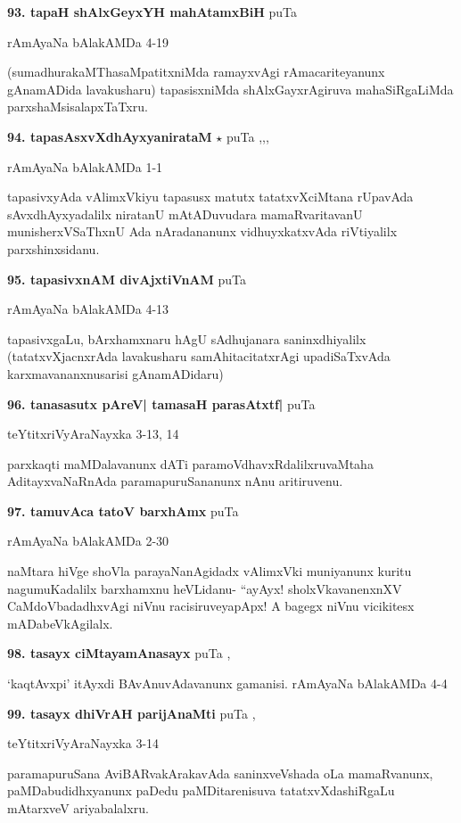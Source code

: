 \medskip
\noindent\textbf{93. tapaH shAlxGeyxYH mahAtamxBiH} \hfill puTa \pageref{211}

\hfill rAmAyaNa bAlakAMDa 4-19

(sumadhurakaMThasaMpatitxniMda ramayxvAgi rAmacariteyanunx gAnamADida lavakusharu) tapasisxniMda shAlxGayxrAgiruva mahaSiRgaLiMda parxshaMsisalapxTaTxru. 

\medskip
\noindent\textbf{94. tapasAsxvXdhAyxyanirataM} $\star$ \hfill puTa \pageref{153},\pageref{162},\pageref{194},\pageref{232e}

\hfill rAmAyaNa bAlakAMDa 1-1

tapasivxyAda vAlimxVkiyu tapasusx matutx tatatxvXciMtana rUpavAda sAvxdhAyxyadalilx niratanU mAtADuvudara mamaRvaritavanU munisherxVSaThxnU Ada nAradananunx vidhuyxkatxvAda riVtiyalilx parxshinxsidanu.

\medskip
\noindent\textbf{95. tapasivxnAM divAjxtiVnAM } \hfill puTa \pageref{211}

\hfill rAmAyaNa bAlakAMDa 4-13

tapasivxgaLu, bArxhamxnaru hAgU sAdhujanara saninxdhiyalilx (tatatxvXjacnxrAda lavakusharu samAhitacitatxrAgi upadiSaTxvAda karxmavananxnusarisi gAnamADidaru)

\medskip
\noindent\textbf{96. tanasasutx pAreV| tamasaH parasAtxtf|} \hfill puTa \pageref{251}

\hfill teYtitxriVyAraNayxka 3-13, 14

parxkaqti maMDalavanunx dATi paramoVdhavxRdalilxruvaMtaha AditayxvaNaRnAda paramapuruSananunx nAnu aritiruvenu.

\medskip
\noindent\textbf{97. tamuvAca tatoV barxhAmx} \hfill puTa \pageref{203d}

\hfill rAmAyaNa bAlakAMDa 2-30

naMtara hiVge shoVla parayaNanAgidadx vAlimxVki muniyanunx kuritu nagumuKadalilx barxhamxnu heVLidanu- ``ayAyx! sholxVkavanenxnXV CaMdoVbadadhxvAgi niVnu racisiruveyapApx! A bagegx niVnu vicikitesx mADabeVkAgilalx. 

\medskip
\noindent\textbf{98. tasayx  ciMtayamAnasayx} \hfill puTa \pageref{238c},\pageref{240}

`kaqtAvxpi' itAyxdi BAvAnuvAdavanunx gamanisi. \hfill rAmAyaNa bAlakAMDa 4-4

\medskip
\noindent\textbf{99. tasayx dhiVrAH parijAnaMti} \hfill puTa \pageref{150},\pageref{251}

\hfill teYtitxriVyAraNayxka 3-14

paramapuruSana AviBARvakArakavAda saninxveVshada oLa mamaRvanunx, paMDabudidhxyanunx paDedu paMDitarenisuva tatatxvXdashiRgaLu mAtarxveV ariyabalalxru.

